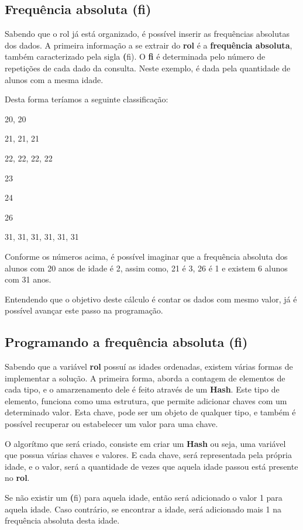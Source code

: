 \documentclass[espaco=simples,appendix=Name]{abnt}
\begin{document}
\subsection { Frequência absoluta (fi) }




Sabendo que o rol já está organizado, é possível inserir  as frequências absolutas dos dados. A primeira informação a se extrair do \textbf{rol} é a \textbf{frequência absoluta}, também caracterizado pela sigla \textbf(fi). O \textbf{fi} é determinada pelo número de repetições de cada dado da consulta. Neste exemplo, é dada pela quantidade de alunos com a mesma idade.

Desta forma teríamos a seguinte classificação:

20, 20

21, 21, 21

22, 22, 22, 22

23

24

26

31, 31, 31, 31, 31, 31


Conforme os números acima, é possível imaginar que a frequência absoluta dos alunos com 20 anos de idade é 2, assim como, 21 é 3, 26 é 1 e existem 6 alunos com 31 anos.

Entendendo que o objetivo deste cálculo é contar os dados com mesmo valor, já é possível avançar este passo na programação.

\subsection { Programando a frequência absoluta (fi) }

Sabendo que a variável \textbf{rol} possuí as idades ordenadas, existem várias formas de implementar a solução. A primeira forma, aborda a contagem de elementos de cada tipo, e o amarzenamento dele é feito através de um \textbf{Hash}. Este tipo de elemento, funciona como uma estrutura, que permite adicionar chaves com um determinado valor. Esta chave, pode ser um objeto de qualquer tipo, e também é possível recuperar ou estabelecer um valor para uma chave.

O algorítmo que será criado, consiste em criar um \textbf{Hash} ou seja, uma variável que possua várias chaves e valores. E cada chave, será representada pela própria idade, e o valor, será a quantidade de vezes que aquela idade passou está presente no \textbf{rol}. 

Se não existir um \textbf(fi) para aquela idade, então será adicionado o valor 1 para aquela idade.
Caso contrário, se encontrar a idade, será adicionado mais 1 na frequência absoluta desta idade.
\end{document}
